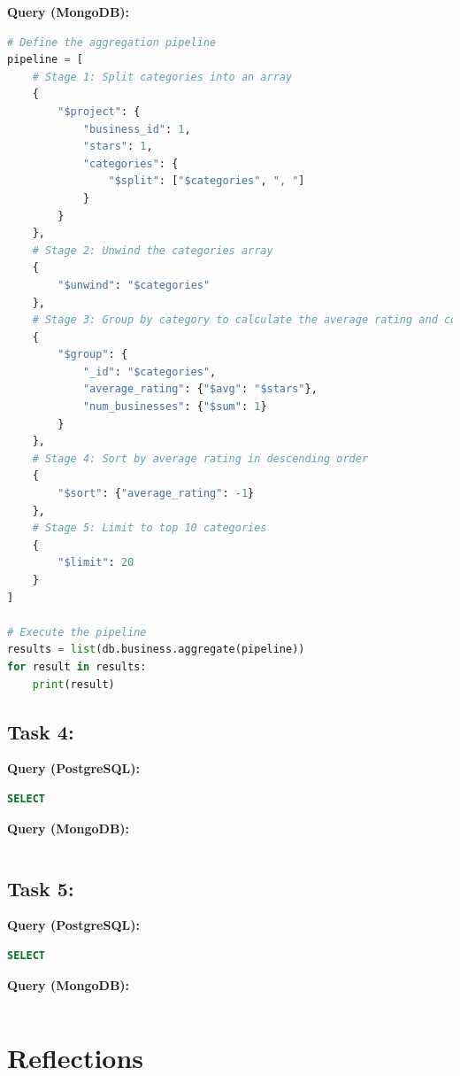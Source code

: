 \documentclass[12pt]{article}
\begin{document}
\textbf{Query (MongoDB):}
\begin{lstlisting}[language=python]
# Define the aggregation pipeline
pipeline = [
    # Stage 1: Split categories into an array
    {
        "$project": {
            "business_id": 1,
            "stars": 1,
            "categories": {
                "$split": ["$categories", ", "]
            }
        }
    },
    # Stage 2: Unwind the categories array
    {
        "$unwind": "$categories"
    },
    # Stage 3: Group by category to calculate the average rating and count
    {
        "$group": {
            "_id": "$categories",
            "average_rating": {"$avg": "$stars"},
            "num_businesses": {"$sum": 1}
        }
    },
    # Stage 4: Sort by average rating in descending order
    {
        "$sort": {"average_rating": -1}
    },
    # Stage 5: Limit to top 10 categories
    {
        "$limit": 20
    }
]

# Execute the pipeline
results = list(db.business.aggregate(pipeline))
for result in results:
    print(result)

\end{lstlisting}

\subsection*{Task 4: }
\textbf{Query (PostgreSQL):}
\begin{lstlisting}[language=SQL]
SELECT 
\end{lstlisting}

\textbf{Query (MongoDB):}
\begin{lstlisting}[language=python]

\end{lstlisting}

\subsection*{Task 5: }
\textbf{Query (PostgreSQL):}
\begin{lstlisting}[language=SQL]
SELECT 
\end{lstlisting}

\textbf{Query (MongoDB):}
\begin{lstlisting}[language=python]

\end{lstlisting}

\section{Reflections}
\end{document}
